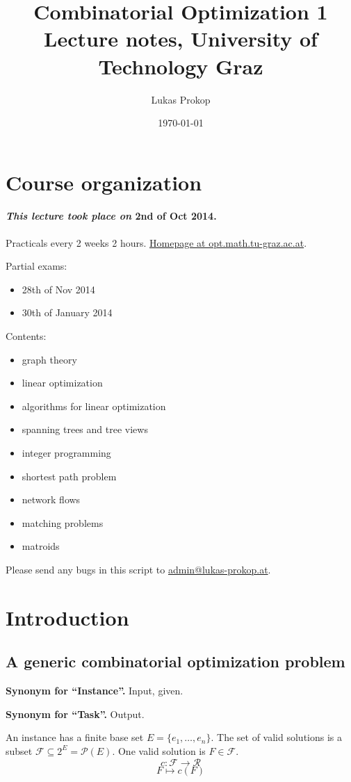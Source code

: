 \documentclass{article}
\title{
  Combinatorial Optimization 1 \\
  \large{Lecture notes, University of Technology Graz}
}
\date{\today}
\author{Lukas Prokop}
\newcommand{\dateref}[1]{\paragraph{\textit{This lecture took place on} #1.}}
\newcommand{\synonym}[2]{\textbf{Synonym for ``#1''.} #2.\par}
\begin{document}
\maketitle
\tableofcontents

\section{Course organization}
%
\dateref{2nd of Oct 2014}

Practicals every 2 weeks 2 hours.
\href{http://opt.math.tu-graz.ac.at/~cela/Vorlesungen/KombOpt1/main.htm}{Homepage at opt.math.tu-graz.ac.at}.

Partial exams:
\begin{itemize}
  \item 28th of Nov 2014
  \item 30th of January 2014
\end{itemize}

Contents:
\begin{itemize}
  \item graph theory
  \item linear optimization
  \item algorithms for linear optimization
  \item spanning trees and tree views
  \item integer programming
  \item shortest path problem
  \item network flows
  \item matching problems
  \item matroids
\end{itemize}

Please send any bugs in this script to \href{mailto:admin@lukas-prokop.at}{admin@lukas-prokop.at}.

\newpage
\section{Introduction}

\subsection{A generic combinatorial optimization problem}
%
\synonym{Instance}{Input, given}
\synonym{Task}{Output}

An instance has a finite base set $E = \{e_1, \ldots, e_n\}$.
The set of valid solutions is a subset $\mathcal{F} \subseteq 2^E = \mathcal{P}(E)$.
One valid solution is $F \in \mathcal{F}$.
\[
    c : \mathcal{F} \rightarrow \mathcal{R}
\] \[
    F \mapsto c(F)
\]
\end{document}
